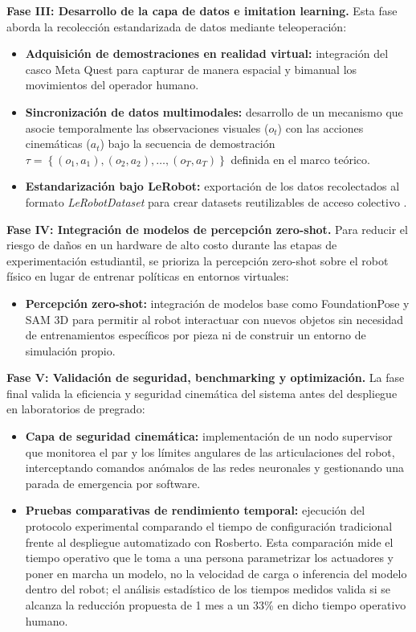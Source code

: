\documentclass[stu,12pt,floatsintext]{apa7}
\begin{document}
\textbf{Fase III: Desarrollo de la capa de datos e imitation learning.} Esta fase aborda la recolección estandarizada de datos mediante teleoperación:
\begin{itemize}
    \item \textbf{Adquisición de demostraciones en realidad virtual:} integración del casco Meta Quest para capturar de manera espacial y bimanual los movimientos del operador humano.
    \item \textbf{Sincronización de datos multimodales:} desarrollo de un mecanismo que asocie temporalmente las observaciones visuales ($o_t$) con las acciones cinemáticas ($a_t$) bajo la secuencia de demostración $\tau = \left\{(o_1,a_1),(o_2,a_2),\ldots,(o_T,a_T)\right\}$ definida en el marco teórico.
    \item \textbf{Estandarización bajo LeRobot:} exportación de los datos recolectados al formato \textit{LeRobotDataset} para crear datasets reutilizables de acceso colectivo \parencite{cadene2026lerobotopensourcelibraryendtoend}.
\end{itemize}

\textbf{Fase IV: Integración de modelos de percepción zero-shot.} Para reducir el riesgo de daños en un hardware de alto costo durante las etapas de experimentación estudiantil, se prioriza la percepción zero-shot sobre el robot físico en lugar de entrenar políticas en entornos virtuales:
\begin{itemize}
    \item \textbf{Percepción zero-shot:} integración de modelos base como FoundationPose y SAM 3D para permitir al robot interactuar con nuevos objetos sin necesidad de entrenamientos específicos por pieza ni de construir un entorno de simulación propio.
\end{itemize}

\textbf{Fase V: Validación de seguridad, benchmarking y optimización.} La fase final valida la eficiencia y seguridad cinemática del sistema antes del despliegue en laboratorios de pregrado:
\begin{itemize}
    \item \textbf{Capa de seguridad cinemática:} implementación de un nodo supervisor que monitorea el par y los límites angulares de las articulaciones del robot, interceptando comandos anómalos de las redes neuronales y gestionando una parada de emergencia por software.
    \item \textbf{Pruebas comparativas de rendimiento temporal:} ejecución del protocolo experimental comparando el tiempo de configuración tradicional frente al despliegue automatizado con Rosberto. Esta comparación mide el tiempo operativo que le toma a una persona parametrizar los actuadores y poner en marcha un modelo, no la velocidad de carga o inferencia del modelo dentro del robot; el análisis estadístico de los tiempos medidos valida si se alcanza la reducción propuesta de 1 mes a un 33\% en dicho tiempo operativo humano.
\end{itemize}
\end{document}
